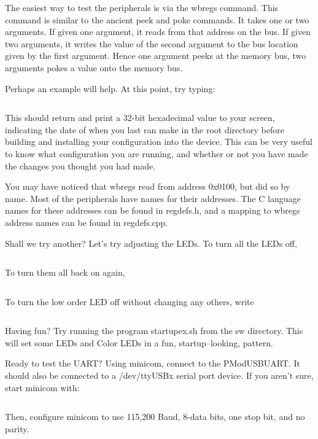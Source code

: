 \documentclass{gqtekspec}
\begin{document}
The easiest way to test the peripherals is via the wbregs command.  This
command is similar to the ancient peek and poke commands.  It takes one
or two arguments.  If given one argument, it reads from that address on the
bus.  If given two arguments, it writes the value of the second argument to
the bus location given by the first argument.  Hence one argument peeks
at the memory bus, two arguments pokes a value onto the memory bus.

Perhaps an example will help.  At this point, try typing:

\begin{lstlisting}[language=bash]
% wbregs version
\end{lstlisting}

This should return and print a 32-bit hexadecimal value to your screen,
indicating the date of when you last ran make in the root directory before
building and installing your configuration into the device.  This can be
very useful to know what configuration you are running, and whether or not
you have made the changes you thought you had made.

You may have noticed that wbregs read from address 0x0100, but did so by name.
Most of the peripherals have names for their addresses.  The C language
names for these addresses can be found in regdefs.h, and a mapping to 
wbregs address names can be found in regdefs.cpp.

Shall we try another?  Let's try adjusting the LEDs.  To turn all the LEDs off, 
\begin{lstlisting}[language=bash]
% wbregs leds 0x0f0
\end{lstlisting}
To turn them all back on again,
\begin{lstlisting}[language=bash]
% wbregs leds 0x0ff
\end{lstlisting}
To turn the low order LED off without changing any others, write
\begin{lstlisting}[language=bash]
% wbregs leds 0x010
\end{lstlisting}

Having fun?  Try running the program startupex.sh from the sw directory.
This will set some LEDs and Color LEDs in a fun, startup--looking, pattern.

Ready to test the UART?   Using minicom, connect to the PModUSBUART.  It 
should also be connected to a /dev/ttyUSBx serial port device.  If you aren't
sure, start minicom with:
\begin{lstlisting}[language=bash]
% minicom -D /dev/ttyUSB2
\end{lstlisting}
Then, configure minicom to use 115,200 Baud, 8-data bits, one stop bit, and
no parity. 
\end{document}
